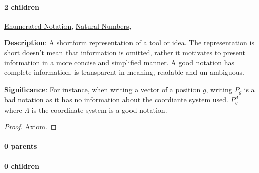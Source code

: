 \documentclass[../main.tex]{subfiles}
\begin{document}
\paragraph{2 children} \hyperref[statement:Enumerated Notation]{Enumerated Notation}, \hyperref[statement:Natural Numbers]{Natural Numbers}, 



\begin{statement}
\label{statement:Notation}\hspace*{0pt}\par
\end{statement}
\textbf{Description}:
A shortform representation of a tool or idea.
The representation is short doesn't mean that information is omitted, rather it motivates to present information in a more concise and simplified manner.
A good notation has complete information, is transparent in meaning, readable and un-ambiguous.
\par
{\color{magenta} \textbf{Significance}:
For instance, when writing a vector of a position $g$, writing $ P_{g} $ is a bad notation as it has no information about the coordiante system used.
$ P^{\Lambda}_{g} $ where $ \Lambda $ is the coordinate system is a good notation.
\par}
\begin{proof}Axiom.\end{proof}\par
\paragraph{0 parents} 
\paragraph{0 children} 
\end{document}
